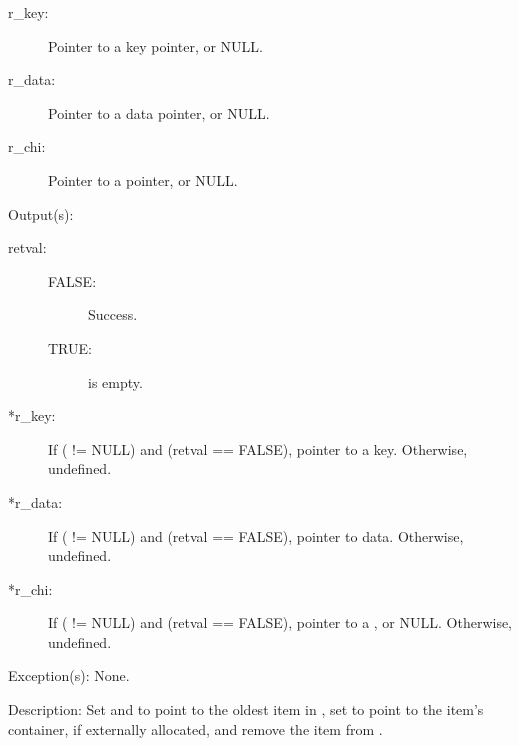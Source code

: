 \begin{capi}
\begin{capilist}
\begin{description}
		\item[r\_key: ]
			Pointer to a key pointer, or NULL.
		\item[r\_data: ]
			Pointer to a data pointer, or NULL.
		\item[r\_chi: ]
			Pointer to a  pointer, or NULL.
		\end{description}
	\item[Output(s): ]
		\begin{description}\item[]
		\item[retval: ]
			\begin{description}\item[]
			\item[FALSE: ]
				Success.
			\item[TRUE: ]
				 is empty.
			\end{description}
		\item[*r\_key: ]
			If ( != NULL) and (retval == FALSE),
			pointer to a key.  Otherwise, undefined.
		\item[*r\_data: ]
			If ( != NULL) and (retval == FALSE),
			pointer to data.  Otherwise, undefined.
		\item[*r\_chi: ]
			If ( != NULL) and (retval == FALSE),
			pointer to a , or NULL.  Otherwise,
			undefined.
		\end{description}
	\item[Exception(s): ] None.
	\item[Description: ]
		Set  and  to point to the oldest
		item in , set  to point to the item's
		container, if externally allocated, and remove the item from
		.
	\end{capilist}
\end{capi}
